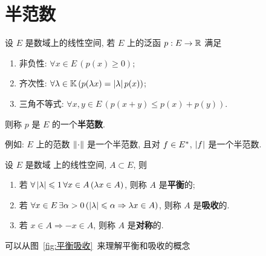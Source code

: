 \section{半范数}
    \begin{Definition}[半范数]\label{def:半范数}
        设 $ E $ 是数域\K 上的线性空间, 若 $ E $ 上的泛函 $ p : E\to \mathbb{R} $ 满足
        \begin{enumerate}[(1)]
            \item 非负性: $ \forall x\in E\,(p(x)\geqslant0) $;
            \item 齐次性: $ \forall \lambda\in\mathbb{K}\,(p(\lambda x)=\left| \lambda \right| p(x)) $;
            \item 三角不等式: $ \forall x, y\in E\,(p(x+y)\leqslant p(x)+p(y)) $.
        \end{enumerate}
        则称 $ p $ 是 $ E $ 的一个\textbf{半范数}.
    \end{Definition}
    例如: $ E $ 上的范数 $ \left\| \cdot \right\| $ 是一个半范数, 且对 $ f\in E^{*} $, $ \left| f \right|  $ 是一个半范数.
    \begin{Definition}[平衡, 吸收]\label{def:平衡吸收}
        设 $ E $ 是数域 \K 上的线性空间, $ A\subset E $, 则
        \begin{enumerate}[(1)]
            \item 若 $ \forall\left| \lambda \right| \leqslant1\,\forall x\in A\,(\lambda x\in A) $, 则称 $ A $ 是\textbf{平衡}的;
            \item 若 $ \forall x\in E\,\exists \alpha>0\,(\left| \lambda \right| \leqslant\alpha\Rightarrow\lambda x \in A) $, 则称 $ A $ 是\textbf{吸收}的. 
            \item 若 $ x\in A\Rightarrow -x\in A $, 则称 $ A $ 是\textbf{对称}的. 
        \end{enumerate}
    \end{Definition}
    可以从图~\ref{fig:平衡吸收}~来理解平衡和吸收的概念
